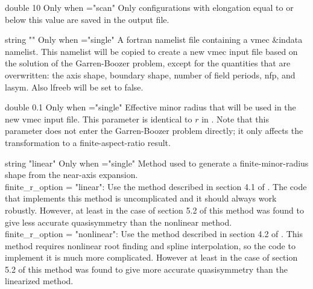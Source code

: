 \myhrule

{double}
{10}
{Only when ={\ttfamily "scan"}}
{Only configurations with elongation equal to or below this value are saved in the output file.}

\myhrule

{string}
{{\ttfamily ""}}
{Only when ={\ttfamily "single"}}
{A fortran namelist file containing a vmec {\ttfamily \&indata} namelist. This namelist will be copied to create a new vmec input file based on the solution of the Garren-Boozer problem, except for the quantities that are overwritten: the axis shape, boundary shape, number of field periods, {\ttfamily nfp}, and {\ttfamily lasym}. Also {\ttfamily lfreeb} will be set to false.}

\myhrule

{double}
{0.1}
{Only when ={\ttfamily "single"}}
{Effective minor radius that will be used in the new vmec input file.  This parameter is identical to $r$ in \cite{PaperII}. Note that this parameter does not enter the Garren-Boozer problem directly; it only affects the transformation to a finite-aspect-ratio result.}

\myhrule

{string}
{{\ttfamily "linear"}}
{Only when ={\ttfamily "single"}}
{Method used to generate a finite-minor-radius shape from the near-axis expansion.\\

{\ttfamily finite\_r\_option} = {\ttfamily "linear"}: Use the method described in section 4.1 of \cite{PaperII}. The code that implements this method is uncomplicated and it should always work robustly. However, at least in the case of
section 5.2 of \cite{PaperII} this method was found to give less accurate quasisymmetry than the nonlinear method.
 \\

{\ttfamily finite\_r\_option} = {\ttfamily "nonlinear"}: Use the method described in section 4.2 of \cite{PaperII}. 
This method requires nonlinear root finding and spline interpolation, so the code to implement it is much more complicated. However at least in the case of section 5.2 of \cite{PaperII} this method was found to give more accurate quasisymmetry than the linearized method.
}

\myhrule


